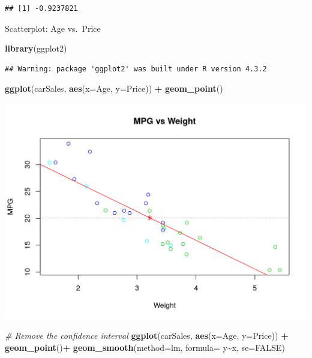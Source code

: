 \documentclass[
]{article}
\newenvironment{Shaded}{\begin{snugshade}}{\end{snugshade}}
\newcommand{\AttributeTok}[1]{\textcolor[rgb]{0.13,0.29,0.53}{#1}}
\newcommand{\CommentTok}[1]{\textcolor[rgb]{0.56,0.35,0.01}{\textit{#1}}}
\newcommand{\ConstantTok}[1]{\textcolor[rgb]{0.56,0.35,0.01}{#1}}
\newcommand{\FunctionTok}[1]{\textcolor[rgb]{0.13,0.29,0.53}{\textbf{#1}}}
\newcommand{\NormalTok}[1]{#1}
\newcommand{\SpecialCharTok}[1]{\textcolor[rgb]{0.81,0.36,0.00}{\textbf{#1}}}
\begin{document}
\begin{verbatim}
## [1] -0.9237821
\end{verbatim}

Scatterplot: Age vs.~Price

\begin{Shaded}
\begin{Highlighting}[]
\FunctionTok{library}\NormalTok{(ggplot2)}
\end{Highlighting}
\end{Shaded}

\begin{verbatim}
## Warning: package 'ggplot2' was built under R version 4.3.2
\end{verbatim}

\begin{Shaded}
\begin{Highlighting}[]
\FunctionTok{ggplot}\NormalTok{(carSales, }\FunctionTok{aes}\NormalTok{(}\AttributeTok{x=}\NormalTok{Age, }\AttributeTok{y=}\NormalTok{Price)) }\SpecialCharTok{+} \FunctionTok{geom\_point}\NormalTok{()}
\end{Highlighting}
\end{Shaded}
 
\begin{center}\includegraphics[width=0.5\linewidth,height=0.5\textheight]{unnamed-chunk-9-1} \end{center}

\begin{Shaded}
\begin{Highlighting}[]
\CommentTok{\# Remove the confidence interval}
\FunctionTok{ggplot}\NormalTok{(carSales, }\FunctionTok{aes}\NormalTok{(}\AttributeTok{x=}\NormalTok{Age, }\AttributeTok{y=}\NormalTok{Price)) }\SpecialCharTok{+} 
  \FunctionTok{geom\_point}\NormalTok{()}\SpecialCharTok{+}
  \FunctionTok{geom\_smooth}\NormalTok{(}\AttributeTok{method=}\NormalTok{lm, }\AttributeTok{formula=}\NormalTok{ y}\SpecialCharTok{\textasciitilde{}}\NormalTok{x, }\AttributeTok{se=}\ConstantTok{FALSE}\NormalTok{)}
\end{Highlighting}
\end{Shaded}
\end{document}
